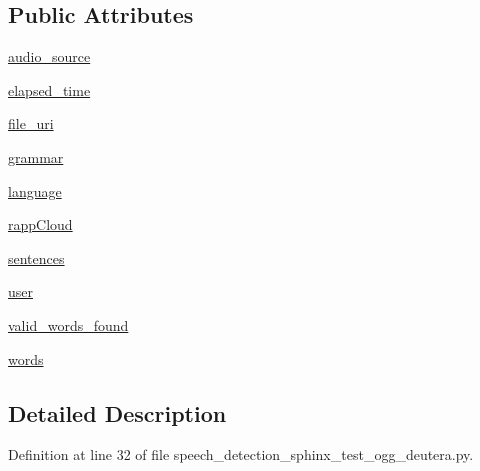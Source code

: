 \subsection*{Public Attributes}
\begin{DoxyCompactItemize}
\item 
\hyperlink{classspeech__detection__sphinx__test__ogg__deutera_1_1RappInterfaceTest_a2085d1faa183f97f93c927ecf46b678a}{audio\-\_\-source}
\item 
\hyperlink{classspeech__detection__sphinx__test__ogg__deutera_1_1RappInterfaceTest_a876679bcc4ed3a4459d014b86f1f16eb}{elapsed\-\_\-time}
\item 
\hyperlink{classspeech__detection__sphinx__test__ogg__deutera_1_1RappInterfaceTest_a01c21452c62b10a81447aba823f2ae23}{file\-\_\-uri}
\item 
\hyperlink{classspeech__detection__sphinx__test__ogg__deutera_1_1RappInterfaceTest_a8e220cd56217ff9b162a6b5ea4679163}{grammar}
\item 
\hyperlink{classspeech__detection__sphinx__test__ogg__deutera_1_1RappInterfaceTest_aaafd94174455fbbc3831cb36aa46eba5}{language}
\item 
\hyperlink{classspeech__detection__sphinx__test__ogg__deutera_1_1RappInterfaceTest_afc34b102783fd62a24a7f26311a56230}{rapp\-Cloud}
\item 
\hyperlink{classspeech__detection__sphinx__test__ogg__deutera_1_1RappInterfaceTest_a15e6db1efc70242896e89e06a3de9239}{sentences}
\item 
\hyperlink{classspeech__detection__sphinx__test__ogg__deutera_1_1RappInterfaceTest_a6ea5db18064764bd90a065a01c332516}{user}
\item 
\hyperlink{classspeech__detection__sphinx__test__ogg__deutera_1_1RappInterfaceTest_ad94b8f879ac28451caecb43b85a87f26}{valid\-\_\-words\-\_\-found}
\item 
\hyperlink{classspeech__detection__sphinx__test__ogg__deutera_1_1RappInterfaceTest_af669927ced20b9af9c26cc4e42d6a7c4}{words}
\end{DoxyCompactItemize}


\subsection{Detailed Description}


Definition at line 32 of file speech\-\_\-detection\-\_\-sphinx\-\_\-test\-\_\-ogg\-\_\-deutera.\-py.



